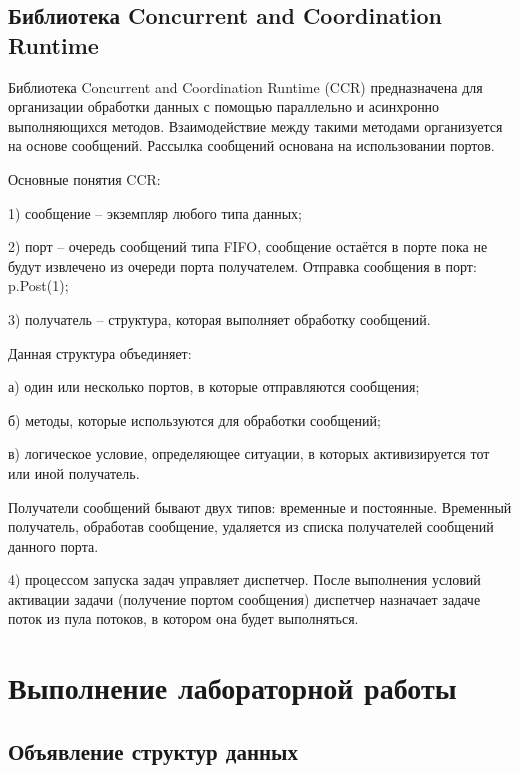 \section{Библиотека Concurrent and Coordination Runtime}
Библиотека Concurrent and Coordination Runtime (CCR) предназначена
для организации обработки данных с помощью параллельно и асинхронно
выполняющихся методов. Взаимодействие между такими методами
организуется на основе сообщений. Рассылка сообщений основана на
использовании портов.

Основные понятия CCR:

1) сообщение – экземпляр любого типа данных;

2) порт – очередь сообщений типа FIFO,
сообщение остаётся в порте пока не будут извлечено из очереди порта
получателем.
Отправка сообщения в порт:
p.Post(1);

3) получатель – структура, которая выполняет обработку сообщений.

Данная структура объединяет:

а) один или несколько портов, в которые отправляются сообщения;

б) методы, которые используются для обработки
сообщений;

в) логическое условие, определяющее ситуации, в которых
активизируется тот или иной получатель.

Получатели сообщений бывают двух типов: временные и постоянные. Временный получатель, обработав
сообщение, удаляется из списка получателей
сообщений данного порта.

4) процессом запуска задач управляет диспетчер. После выполнения
условий активации задачи (получение портом сообщения) диспетчер назначает задаче поток из пула
потоков, в котором она будет выполняться.

\chapter{Выполнение лабораторной работы}						

\setcounter{page}{3}
\rfoot{\thepage}
\fancyfootoffset[L]{-6cm}
\setlength{\footskip}{1.3cm}

\section{Объявление структур данных}


